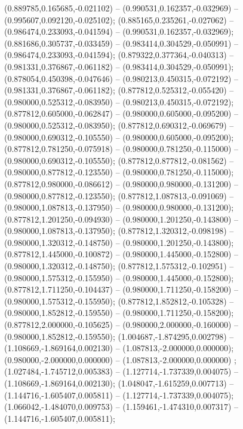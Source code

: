  (0.889785,0.165685,-0.021102) -- (0.990531,0.162357,-0.032969) -- (0.995607,0.092120,-0.025102);
 (0.885165,0.235261,-0.027062) -- (0.986474,0.233093,-0.041594) -- (0.990531,0.162357,-0.032969);
 (0.881686,0.305737,-0.033459) -- (0.983414,0.304529,-0.050991) -- (0.986474,0.233093,-0.041594);
 (0.879322,0.377364,-0.040313) -- (0.981331,0.376867,-0.061182) -- (0.983414,0.304529,-0.050991);
 (0.878054,0.450398,-0.047646) -- (0.980213,0.450315,-0.072192) -- (0.981331,0.376867,-0.061182);
 (0.877812,0.525312,-0.055420) -- (0.980000,0.525312,-0.083950) -- (0.980213,0.450315,-0.072192);
 (0.877812,0.605000,-0.062847) -- (0.980000,0.605000,-0.095200) -- (0.980000,0.525312,-0.083950);
 (0.877812,0.690312,-0.069679) -- (0.980000,0.690312,-0.105550) -- (0.980000,0.605000,-0.095200);
 (0.877812,0.781250,-0.075918) -- (0.980000,0.781250,-0.115000) -- (0.980000,0.690312,-0.105550);
 (0.877812,0.877812,-0.081562) -- (0.980000,0.877812,-0.123550) -- (0.980000,0.781250,-0.115000);
 (0.877812,0.980000,-0.086612) -- (0.980000,0.980000,-0.131200) -- (0.980000,0.877812,-0.123550);
 (0.877812,1.087813,-0.091069) -- (0.980000,1.087813,-0.137950) -- (0.980000,0.980000,-0.131200);
 (0.877812,1.201250,-0.094930) -- (0.980000,1.201250,-0.143800) -- (0.980000,1.087813,-0.137950);
 (0.877812,1.320312,-0.098198) -- (0.980000,1.320312,-0.148750) -- (0.980000,1.201250,-0.143800);
 (0.877812,1.445000,-0.100872) -- (0.980000,1.445000,-0.152800) -- (0.980000,1.320312,-0.148750);
 (0.877812,1.575312,-0.102951) -- (0.980000,1.575312,-0.155950) -- (0.980000,1.445000,-0.152800);
 (0.877812,1.711250,-0.104437) -- (0.980000,1.711250,-0.158200) -- (0.980000,1.575312,-0.155950);
 (0.877812,1.852812,-0.105328) -- (0.980000,1.852812,-0.159550) -- (0.980000,1.711250,-0.158200);
 (0.877812,2.000000,-0.105625) -- (0.980000,2.000000,-0.160000) -- (0.980000,1.852812,-0.159550);
 (1.004687,-1.874295,0.002798) -- (1.108669,-1.869164,0.002130) -- (1.087813,-2.000000,0.000000);
 (0.980000,-2.000000,0.000000) -- (1.087813,-2.000000,0.000000) ;
 (1.027484,-1.745712,0.005383) -- (1.127714,-1.737339,0.004075) -- (1.108669,-1.869164,0.002130);
 (1.048047,-1.615259,0.007713) -- (1.144716,-1.605407,0.005811) -- (1.127714,-1.737339,0.004075);
 (1.066042,-1.484070,0.009753) -- (1.159461,-1.474310,0.007317) -- (1.144716,-1.605407,0.005811);
